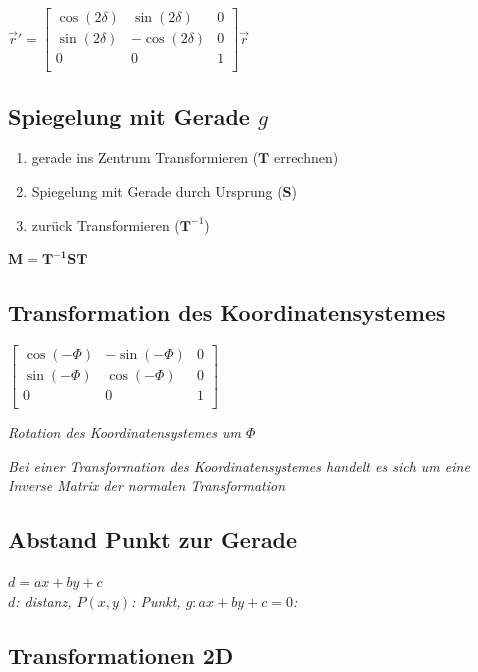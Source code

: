 $\vec{r}' = \left[\begin{array}{cc|c}
    \cos(2\delta) & \sin(2\delta) & 0 \\
    \sin(2\delta) & -\cos(2\delta) & 0 \\
    \hline
    0 & 0 & 1 \\
\end{array}\right] \vec{r}$

\subsection{Spiegelung mit Gerade $g$}

\begin{enumerate}
    \item gerade ins Zentrum Transformieren ($\mathbf{T}$ errechnen)
    \item Spiegelung mit Gerade durch Ursprung ($\mathbf{S}$)
    \item zurück Transformieren ($\mathbf{T}^{-1}$)
\end{enumerate}

$\mathbf{M} = \mathbf{T^{-1}ST}$

\subsection{Transformation des Koordinatensystemes}

$ \begin{bmatrix}
    \cos(-\Phi) & -\sin(-\Phi) & 0 \\
    \sin(-\Phi) & \cos(-\Phi) & 0 \\
    0 & 0 & 1 \\
\end{bmatrix}$

\textit{Rotation des Koordinatensystemes um $\Phi$}

\textit{Bei einer Transformation des Koordinatensystemes
handelt es sich um eine Inverse Matrix der normalen
Transformation}

\subsection{Abstand Punkt zur Gerade}

$d = ax + by + c$
\textit{\\
    $d$: distanz,
    $P(x,y)$: Punkt,
    $g: ax + by + c = 0$:
}

\subsection{Transformationen 2D}


